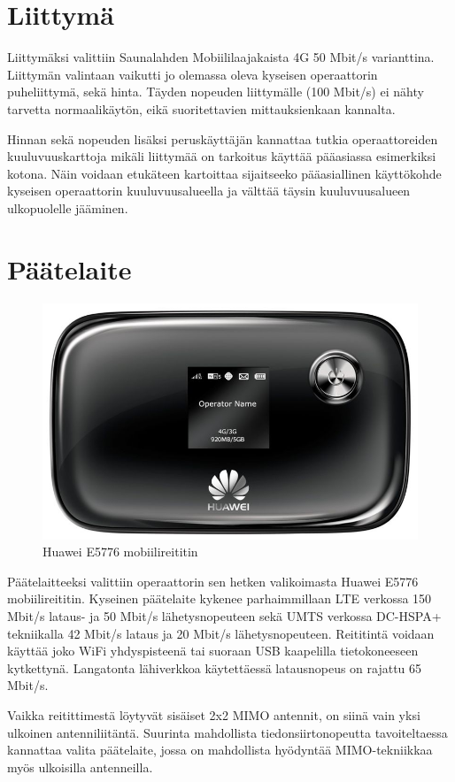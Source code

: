 \documentclass[11pt,a4paper,oneside,article,finnish]{memoir}
\begin{document}
\section{Liittymä}
Liittymäksi valittiin Saunalahden Mobiililaajakaista 4G 50 Mbit/s varianttina. Liittymän valintaan vaikutti jo olemassa oleva kyseisen operaattorin puheliittymä, sekä hinta. Täyden nopeuden liittymälle (100 Mbit/s) ei nähty tarvetta normaalikäytön, eikä suoritettavien mittauksienkaan kannalta.

Hinnan sekä nopeuden lisäksi peruskäyttäjän kannattaa tutkia operaattoreiden kuuluvuuskarttoja mikäli liittymää on tarkoitus käyttää pääasiassa esimerkiksi kotona. Näin voidaan etukäteen kartoittaa sijaitseeko pääasiallinen käyttökohde kyseisen operaattorin kuuluvuusalueella ja välttää täysin kuuluvuusalueen ulkopuolelle jääminen.
\section{Päätelaite}
\begin{figure}[H]
	\centering
	\includegraphics{e5776etu}
	\caption{Huawei E5776 mobiilireititin}
	\label{fig:e5776etu}
\end{figure}

Päätelaitteeksi valittiin operaattorin sen hetken valikoimasta Huawei E5776 mobiilireititin. Kyseinen päätelaite kykenee parhaimmillaan LTE verkossa 150 Mbit/s lataus- ja 50 Mbit/s lähetysnopeuteen sekä UMTS verkossa DC-HSPA+ tekniikalla 42 Mbit/s lataus ja 20 Mbit/s lähetysnopeuteen. Reititintä voidaan käyttää joko WiFi yhdyspisteenä tai suoraan USB kaapelilla tietokoneeseen kytkettynä. Langatonta lähiverkkoa käytettäessä latausnopeus on rajattu 65 Mbit/s.

Vaikka reitittimestä löytyvät sisäiset 2x2 MIMO antennit, on siinä vain yksi ulkoinen antenniliitäntä. Suurinta mahdollista tiedonsiirtonopeutta tavoiteltaessa kannattaa valita päätelaite, jossa on mahdollista hyödyntää MIMO-tekniikkaa myös ulkoisilla antenneilla.
\end{document}
